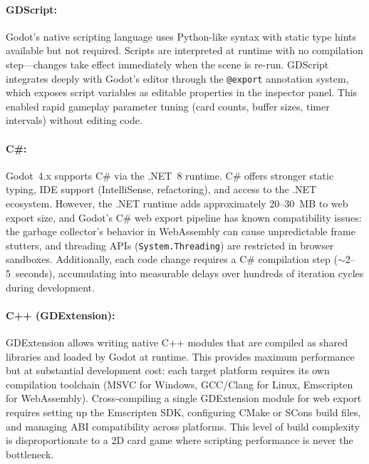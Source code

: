 \paragraph*{GDScript:}
Godot's native scripting language uses Python-like syntax with static type hints available but not required. Scripts are interpreted at runtime with no compilation step---changes take effect immediately when the scene is re-run. GDScript integrates deeply with Godot's editor through the \texttt{@export} annotation system, which exposes script variables as editable properties in the inspector panel. This enabled rapid gameplay parameter tuning (card counts, buffer sizes, timer intervals) without editing code.

\paragraph*{C\#:}
Godot~4.x supports C\# via the .NET~8 runtime. C\# offers stronger static typing, IDE support (IntelliSense, refactoring), and access to the .NET ecosystem. However, the .NET runtime adds approximately 20--30~MB to web export size, and Godot's C\# web export pipeline has known compatibility issues: the garbage collector's behavior in WebAssembly can cause unpredictable frame stutters, and threading APIs (\texttt{System.Threading}) are restricted in browser sandboxes. Additionally, each code change requires a C\# compilation step ($\sim$2--5~seconds), accumulating into measurable delays over hundreds of iteration cycles during development.

\paragraph*{C++ (GDExtension):}
GDExtension allows writing native C++ modules that are compiled as shared libraries and loaded by Godot at runtime. This provides maximum performance but at substantial development cost: each target platform requires its own compilation toolchain (MSVC for Windows, GCC/Clang for Linux, Emscripten for WebAssembly). Cross-compiling a single GDExtension module for web export requires setting up the Emscripten SDK, configuring CMake or SCons build files, and managing ABI compatibility across platforms. This level of build complexity is disproportionate to a 2D card game where scripting performance is never the bottleneck.

